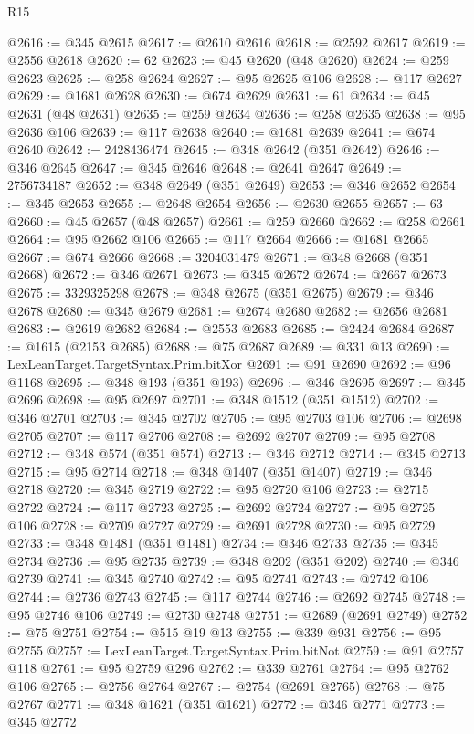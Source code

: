 \begin{lexlean}{R15}
\begin{coremodule}
@2616 := @345 @2615
@2617 := @2610 @2616
@2618 := @2592 @2617
@2619 := @2556 @2618
@2620 := 62
@2623 := @45 @2620 (@48 @2620)
@2624 := @259 @2623
@2625 := @258 @2624
@2627 := @95 @2625 @106
@2628 := @117 @2627
@2629 := @1681 @2628
@2630 := @674 @2629
@2631 := 61
@2634 := @45 @2631 (@48 @2631)
@2635 := @259 @2634
@2636 := @258 @2635
@2638 := @95 @2636 @106
@2639 := @117 @2638
@2640 := @1681 @2639
@2641 := @674 @2640
@2642 := 2428436474
@2645 := @348 @2642 (@351 @2642)
@2646 := @346 @2645
@2647 := @345 @2646
@2648 := @2641 @2647
@2649 := 2756734187
@2652 := @348 @2649 (@351 @2649)
@2653 := @346 @2652
@2654 := @345 @2653
@2655 := @2648 @2654
@2656 := @2630 @2655
@2657 := 63
@2660 := @45 @2657 (@48 @2657)
@2661 := @259 @2660
@2662 := @258 @2661
@2664 := @95 @2662 @106
@2665 := @117 @2664
@2666 := @1681 @2665
@2667 := @674 @2666
@2668 := 3204031479
@2671 := @348 @2668 (@351 @2668)
@2672 := @346 @2671
@2673 := @345 @2672
@2674 := @2667 @2673
@2675 := 3329325298
@2678 := @348 @2675 (@351 @2675)
@2679 := @346 @2678
@2680 := @345 @2679
@2681 := @2674 @2680
@2682 := @2656 @2681
@2683 := @2619 @2682
@2684 := @2553 @2683
@2685 := @2424 @2684
@2687 := @1615 (@2153 @2685)
@2688 := @75 @2687
@2689 := @331 @13
@2690 := LexLeanTarget.TargetSyntax.Prim.bitXor
@2691 := @91 @2690
@2692 := @96 @1168
@2695 := @348 @193 (@351 @193)
@2696 := @346 @2695
@2697 := @345 @2696
@2698 := @95 @2697
@2701 := @348 @1512 (@351 @1512)
@2702 := @346 @2701
@2703 := @345 @2702
@2705 := @95 @2703 @106
@2706 := @2698 @2705
@2707 := @117 @2706
@2708 := @2692 @2707
@2709 := @95 @2708
@2712 := @348 @574 (@351 @574)
@2713 := @346 @2712
@2714 := @345 @2713
@2715 := @95 @2714
@2718 := @348 @1407 (@351 @1407)
@2719 := @346 @2718
@2720 := @345 @2719
@2722 := @95 @2720 @106
@2723 := @2715 @2722
@2724 := @117 @2723
@2725 := @2692 @2724
@2727 := @95 @2725 @106
@2728 := @2709 @2727
@2729 := @2691 @2728
@2730 := @95 @2729
@2733 := @348 @1481 (@351 @1481)
@2734 := @346 @2733
@2735 := @345 @2734
@2736 := @95 @2735
@2739 := @348 @202 (@351 @202)
@2740 := @346 @2739
@2741 := @345 @2740
@2742 := @95 @2741
@2743 := @2742 @106
@2744 := @2736 @2743
@2745 := @117 @2744
@2746 := @2692 @2745
@2748 := @95 @2746 @106
@2749 := @2730 @2748
@2751 := @2689 (@2691 @2749)
@2752 := @75 @2751
@2754 := @515 @19 @13
@2755 := @339 @931
@2756 := @95 @2755
@2757 := LexLeanTarget.TargetSyntax.Prim.bitNot
@2759 := @91 @2757 @118
@2761 := @95 @2759 @296
@2762 := @339 @2761
@2764 := @95 @2762 @106
@2765 := @2756 @2764
@2767 := @2754 (@2691 @2765)
@2768 := @75 @2767
@2771 := @348 @1621 (@351 @1621)
@2772 := @346 @2771
@2773 := @345 @2772

\end{coremodule}
\end{lexlean}
